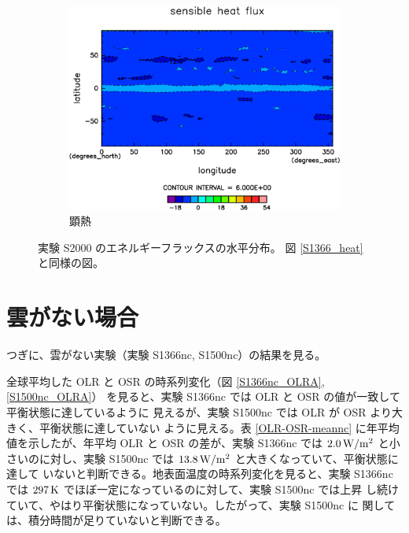 \documentclass[body]{subfiles}
\begin{document}
\begin{figure}[t]
\begin{subfigure}{.4\textwidth}
		\includegraphics[width=\columnwidth]{S2000/Sens,time=7300:7665-crop-rotate.pdf}
		\caption{顕熱\hmu*{[W/m^{-2}]}}\label{S2000顕熱}
	\end{subfigure}
	\caption[実験 S2000 のエネルギーフラックスの水平分布]{
		実験 S2000 のエネルギーフラックスの水平分布。
		図 \ref{S1366_heat} と同様の図。
	}\label{S2000_heat}
\end{figure}

\afterpage{\clearpage}

\section{雲がない場合}

つぎに、雲がない実験（実験 S1366nc, S1500nc）の結果を見る。

全球平均した OLR と OSR の時系列変化（図 \ref{S1366nc_OLRA}, \ref{S1500nc_OLRA}）
を見ると、実験 S1366nc では OLR と OSR の値が一致して平衡状態に達しているように
見えるが、実験 S1500nc では OLR が OSR より大きく、平衡状態に達していない
ように見える。表 \ref{OLR-OSR-meannc} に年平均値を示したが、年平均 OLR と
OSR の差が、実験 S1366nc では \(2.0\hmu{W/m^2}\) と小さいのに対し、実験
S1500nc では \(13.8\hmu{W/m^2}\) と大きくなっていて、平衡状態に達して
いないと判断できる。地表面温度の時系列変化を見ると、実験 S1366nc では
\(297\hmu{K}\) でほぼ一定になっているのに対して、実験 S1500nc では上昇
し続けていて、やはり平衡状態になっていない。したがって、実験 S1500nc に
関しては、積分時間が足りていないと判断できる。
\end{document}
